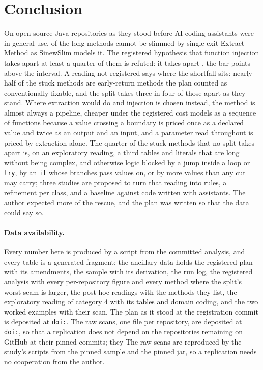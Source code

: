 \documentclass[11pt,a4paper]{article}
\newcommand{\sig}[1]{\texttt{#1}}
\begin{document}
\section{Conclusion}

On \nUsable{} open-source Java repositories as they stood before AI coding
assistants were in general use, \stuckShare{} of the long methods cannot be
slimmed by single-exit Extract Method as SinewSlim models it. The registered
hypothesis that function injection takes apart at least a quarter of them is
refuted: it takes apart \ciCatThreeC{}, the bar \hOneBarGap{} points above
the interval. A reading not registered says where the shortfall sits:
nearly half of the stuck methods are early-return methods the plan counted
as conventionally fixable, and the split takes three in four of those apart
as they stand. Where extraction would do and injection is chosen instead,
the method is almost always a pipeline, cheaper under the registered cost
models as a sequence of functions because a value crossing a boundary is
priced once as a declared value and twice as an output and an input, and a
parameter read throughout is priced by extraction alone. The quarter of the
stuck methods that no split takes apart is, on an exploratory reading, a
third tables and literals that are long without being complex, and
otherwise logic blocked by a jump inside a loop or \sig{try}, by an
\sig{if} whose branches pass values on, or by more values than any cut may
carry; three studies are proposed to turn that reading into rules, a
refinement per class, and a baseline against code written with assistants.
The author expected more of the rescue, and the plan was written so that
the data could say so.

\paragraph{Data availability.} Every number here is produced by a script
from the committed analysis, and every table is a generated fragment; the
ancillary data holds the registered plan with its amendments, the sample with
its derivation, the run log, the registered analysis with every
per-repository figure and every method where the split's worst seam is
larger, the post hoc readings with the methods they list, the exploratory
reading of category 4 with its tables and domain coding, and the two worked
examples with their scan. \ifdefined\plandoi The plan as it stood at the
registration commit is deposited at \texttt{doi:\plandoi}. \fi
\ifdefined\scansdoi The raw scans, one file per repository, are deposited at
\texttt{doi:\scansdoi}, so that a replication does not depend on the
\nUsable{} repositories remaining on GitHub at their pinned commits; they
\else The raw scans \fi
are reproduced by the study's scripts from the pinned sample and the pinned
jar, so a replication needs no cooperation from the author.
\end{document}
